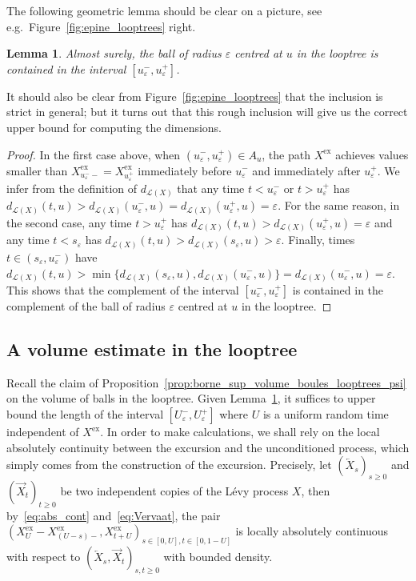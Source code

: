 \documentclass[british, a4paper,11pt]{article}
\numberwithin{equation}{section}
\newtheorem{lem}[thm]{Lemma}
\theoremstyle{definition}
\newcommand{\Loop}{\mathscr{L}}
\newcommand{\exc}{\mathrm{ex}}
\begin{document}
The following geometric lemma should be clear on a picture, see e.g.~Figure~\ref{fig:epine_looptrees} right.

\begin{lem}\label{lem:geom_looptree}
Almost surely, the ball of radius $\varepsilon$ centred at $u$ in the looptree is contained in the interval $[u^-_\varepsilon, u^+_\varepsilon]$.
\end{lem}

It should also be clear from Figure~\ref{fig:epine_looptrees} that the inclusion is strict in general; but it turns out that this rough inclusion will give us the correct upper bound for computing the dimensions.

\begin{proof}
In the first case above, when $(u^-_\varepsilon, u^+_\varepsilon) \in A_u$, the path $X^{\exc}$ achieves values smaller than $X^{\exc}_{u^-_\varepsilon-} = X^{\exc}_{u^+_\varepsilon}$ immediately before $u^-_\varepsilon$ and immediately after $u^+_\varepsilon$. We infer from the definition of $d_{\Loop(X)}$ that any time $t < u^-_\varepsilon$ or $t > u^+_\varepsilon$ has $d_{\Loop(X)}(t,u) > d_{\Loop(X)}(u^-_\varepsilon, u) = d_{\Loop(X)}(u^+_\varepsilon, u) = \varepsilon$.
For the same reason, in the second case, any time $t > u^+_\varepsilon$ has $d_{\Loop(X)}(t,u) > d_{\Loop(X)}(u^+_\varepsilon, u) = \varepsilon$ and any time $t < s_\varepsilon$ has $d_{\Loop(X)}(t,u) > d_{\Loop(X)}(s_\varepsilon, u) > \varepsilon$. Finally, times $t \in (s_\varepsilon, u^-_\varepsilon)$ have $d_{\Loop(X)}(t,u) > \min\{d_{\Loop(X)}(s_\varepsilon, u), d_{\Loop(X)}(u^-_\varepsilon, u)\} = d_{\Loop(X)}(u^-_\varepsilon, u) = \varepsilon$.
This shows that the complement of the interval $[u^-_\varepsilon, u^+_\varepsilon]$ is contained in the complement of the ball of radius $\varepsilon$ centred at $u$ in the looptree.
\end{proof}





\subsection{A volume estimate in the looptree}
\label{sec:volume_boules_looptrees}

Recall the claim of Proposition~\ref{prop:borne_sup_volume_boules_looptrees_psi} on the volume of balls in the looptree. Given Lemma~\ref{lem:geom_looptree}, it suffices to upper bound the length of the interval $[U^-_\varepsilon, U^+_\varepsilon]$ where $U$ is a uniform random time independent of $X^{\exc}$.
In order to make calculations, we shall rely on the local absolutely continuity between the excursion and the unconditioned process, which simply comes from the construction of the excursion. 
Precisely, let $(\overleftarrow{X}_s)_{s \geq 0}$ and $(\overrightarrow{X}_t)_{t \geq 0}$ be two independent copies of the L\'evy process $X$, then by~\eqref{eq:abs_cont} and~\eqref{eq:Vervaat}, the pair 
$(X^{\exc}_U-X^{\exc}_{(U-s)-}, X^{\exc}_{t+U})_{s \in [0,U], t \in [0,1-U]}$ 
is locally absolutely continuous with respect to $(\overleftarrow{X}_s, \overrightarrow{X}_t)_{s,t \geq 0}$ with bounded density.
\end{document}
